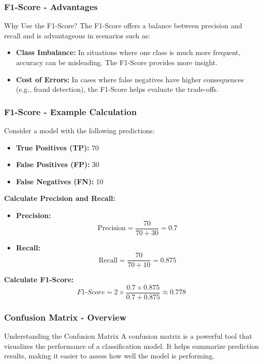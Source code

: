 \documentclass[aspectratio=169]{beamer}
\begin{document}
\begin{frame}[fragile]
    \frametitle{F1-Score - Advantages}
    \begin{block}{Why Use the F1-Score?}
        The F1-Score offers a balance between precision and recall and is advantageous in scenarios such as:
    \end{block}
    \begin{itemize}
        \item \textbf{Class Imbalance:} 
        In situations where one class is much more frequent, accuracy can be misleading. The F1-Score provides more insight.
        \item \textbf{Cost of Errors:} 
        In cases where false negatives have higher consequences (e.g., fraud detection), the F1-Score helps evaluate the trade-offs.
    \end{itemize}
\end{frame}

\begin{frame}[fragile]
    \frametitle{F1-Score - Example Calculation}
    Consider a model with the following predictions:
    \begin{itemize}
        \item \textbf{True Positives (TP):} 70
        \item \textbf{False Positives (FP):} 30
        \item \textbf{False Negatives (FN):} 10
    \end{itemize}

    \textbf{Calculate Precision and Recall:}
    \begin{itemize}
        \item \textbf{Precision:} 
        \[
        \text{Precision} = \frac{70}{70 + 30} = 0.7
        \]
        \item \textbf{Recall:} 
        \[
        \text{Recall} = \frac{70}{70 + 10} = 0.875
        \]
    \end{itemize}
    
    \textbf{Calculate F1-Score:}
    \[
    F1\text{-}Score = 2 \times \frac{0.7 \times 0.875}{0.7 + 0.875} \approx 0.778
    \]
\end{frame}

\begin{frame}[fragile]
    \frametitle{Confusion Matrix - Overview}
    \begin{block}{Understanding the Confusion Matrix}
        A confusion matrix is a powerful tool that visualizes the performance of a classification model. It helps summarize prediction results, making it easier to assess how well the model is performing.
    \end{block}
\end{frame}
\end{document}
